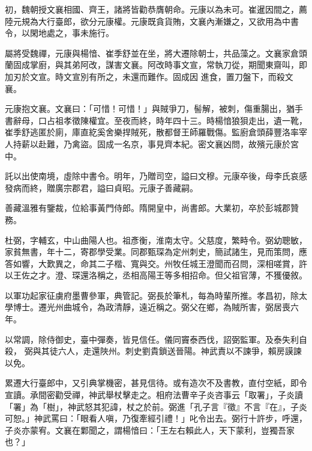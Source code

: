 \begin{pinyinscope}
 初，魏朝授文襄相國、齊王，諸將皆勸恭膺朝命。元康以為未可。崔暹因間之，薦陸元規為大行臺郎，欲分元康權。元康既貪貨賄，文襄內漸嫌之，又欲用為中書令，以閑地處之，事未施行。



 屬將受魏禪，元康與楊愔、崔季舒並在坐，將大遷除朝士，共品藻之。文襄家倉頭蘭固成掌廚，與其弟阿改，謀害文襄。阿改時事文宣，常執刀從，期聞東齋叫，即加刃於文宣。時文宣別有所之，未還而難作。固成因
 進食，置刀盤下，而殺文襄。



 元康抱文襄。文襄曰：「可惜！可惜！」與賊爭刀，髻解，被刺，傷重腸出，猶手書辭母，口占祖孝徵陳權宜。至夜而終，時年四十三。時楊愔狼狽走出，遺一靴，崔季舒逃匿於廁，庫直紇奚舍樂捍賊死，散都督王師羅戰傷。監廚倉頭薛豐洛率宰人持薪以赴難，乃禽盜。固成一名京，事見齊本紀。密文襄凶問，故殯元康於宮中。



 託以出使南境，虛除中書令。明年，乃贈司空，謚曰文穆。元康卒後，母李氏哀感發病而終，贈廣宗郡君，謚曰貞昭。元康子善藏嗣。



 善藏溫雅有鑒裁，位給事黃門侍郎。隋開皇中，尚書郎。大業初，卒於彭城郡贊務。



 杜弼，字輔玄，中山曲陽人也。祖彥衡，淮南太守。父慈度，繁畤令。弼幼聰敏，家貧無書，年十二，寄郡學受業。同郡甄琛為定州刺史，簡試諸生，見而策問，應答如響，大歎異之，命其二子楷、寬與交。州牧任城王澄聞而召問，深相嗟賞，許以王佐之才。澄、琛還洛稱之，丞相高陽王等多相招命。但父祖官薄，不獲優敘。



 以軍功起家征虜府墨曹參軍，典管記。弼長於筆札，每為時輩所推。孝昌初，除太學博士。遷光州曲城令，為政清靜，遠近稱之。弼父在鄉，為賊所害，弼居喪六年。



 以常調，除侍御史，臺中彈奏，皆見信任。儀同竇泰西伐，詔弼監軍。及泰失利自殺，
 弼與其徒六人，走還陜州。刺史劉貴鎖送晉陽。神武責以不諫爭，賴房謨諫以免。



 累遷大行臺郎中，又引典掌機密，甚見信待。或有造次不及書教，直付空紙，即令宣讀。承間密勸受禪，神武舉杖擊走之。相府法曹辛子炎咨事云「取署」，子炎讀「署」為「樹」，神武怒其犯諱，杖之於前。弼進「孔子言『徵』不言『在』，子炎可恕。」神武罵曰：「眼看人嗔，乃復牽經引禮！」叱令出去。弼行十許步，呼還，子炎亦蒙宥。文襄在鄴聞之，謂楊愔曰：「王左右賴此人，天下蒙利，豈獨吾家也？」




\end{pinyinscope}
